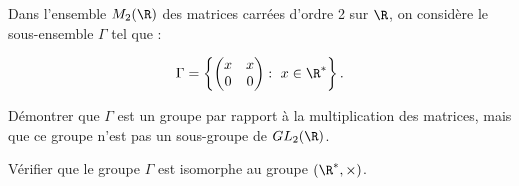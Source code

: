 Dans l'ensemble $M_2(\R)$ des matrices carrées d'ordre 2 sur $\R$, on considère le sous-ensemble $\Gamma$ tel que :

\[ \Gamma = \left\{ \begin{pmatrix}
x & x \\
0 & 0
\end{pmatrix}:\ x\in \R^* \right\}.\]

Démontrer que $\Gamma$ est un groupe par rapport à la multiplication des matrices, mais que ce groupe n'est pas un sous-groupe de $GL_2(\R)$.

Vérifier que le groupe $\Gamma$ est isomorphe au groupe $(\R^*, \times)$.